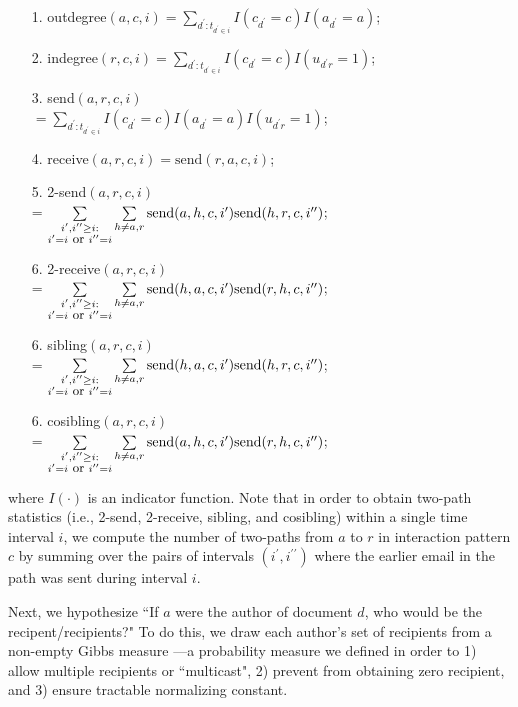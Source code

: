 \documentclass{article}
\begin{document}
\begin{itemize}
	\item[1.] outdegree$(a,c,i)=\sum\limits_{d^\prime:t_{d^\prime \in i}} I(c_{d^\prime} = c)I(a_{d^\prime} = a)$;
	\item[2.] indegree$(r,c,i)=\sum\limits_{d^\prime:t_{d^\prime \in i}} I(c_{d^\prime} = c)I(u_{d^\prime r} = 1)$;
	\item[3.] send$(a,r,c,i)$\\
	$=\sum\limits_{d^\prime:t_{d^\prime \in i}} I(c_{d^\prime} = c)I(a_{d^\prime} = a)I(u_{d^\prime r} = 1)$;
	\item[4.] receive$(a,r,c,i)=\mbox{send}(r,a,c,i)$;
	\item[5.] 2-send$(a,r,c,i) $\\= $\sum\limits_{\substack{i^\prime, i^{\prime\prime}\geq i:\\i^\prime = i \mbox{ \small or }i^{\prime\prime}=i}}\sum\limits_{h \neq a, r} \mbox{send}(a,h,c,i^\prime)\mbox{send}(h,r,c,i^{\prime\prime})$;
	\item[6.] 2-receive$(a,r,c,i) $\\= $\sum\limits_{\substack{i^\prime, i^{\prime\prime}\geq i:\\i^\prime = i \mbox{ \small or }i^{\prime\prime}=i}}\sum\limits_{h \neq a, r} \mbox{send}(h,a,c,i^\prime)\mbox{send}(r,h,c,i^{\prime\prime})$;
	\item[6.] sibling$(a,r,c,i) $\\= $\sum\limits_{\substack{i^\prime, i^{\prime\prime}\geq i:\\i^\prime = i \mbox{ \small or }i^{\prime\prime}=i}}\sum\limits_{h \neq a, r} \mbox{send}(h,a,c,i^\prime)\mbox{send}(h,r,c,i^{\prime\prime})$;
	\item[6.] cosibling$(a,r,c,i) $\\= $\sum\limits_{\substack{i^\prime, i^{\prime\prime}\geq i:\\i^\prime = i \mbox{ \small or }i^{\prime\prime}=i}}\sum\limits_{h \neq a, r} \mbox{send}(a,h,c,i^\prime)\mbox{send}(r,h,c,i^{\prime\prime})$;
\end{itemize}
where $I(\cdot)$ is an indicator function. Note that in order to obtain two-path statistics (i.e., 2-send, 2-receive, sibling, and cosibling) within a single time interval $i$, we compute the number of two-paths from $a$ to $r$ in interaction pattern $c$ by summing over the pairs of intervals $(i^\prime, i^{\prime\prime})$ where the earlier email in the path was sent during interval $i$. 

Next, we hypothesize ``If $a$ were the
author of document $d$, who would be the recipent/recipients?" To do this, we draw each author's set of recipients from a non-empty Gibbs measure \cite{fellows2017removing}---a probability measure we defined in order to 1) allow multiple recipients or ``multicast", 2) prevent from obtaining zero recipient, and 3) ensure tractable normalizing constant. 
\end{document}
